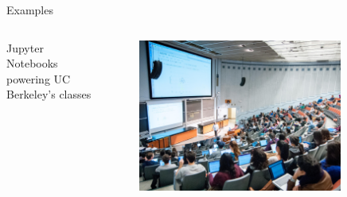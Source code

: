 \documentclass[11pt,t]{beamer}
\begin{document}
\begin{frame}[fragile]{Examples}  

	\begin{columns}[t]
		\begin{column}{.3\textwidth}
		Jupyter Notebooks powering UC Berkeley’s classes
	
 
		\end{column}
		\begin{column}{.7\textwidth}
			\vspace{-25pt}
			\begin{figure}
			\centering
			\includegraphics[width=0.85\textwidth]{jupyter_berkeley}
			
			\end{figure}
		\end{column}
	\end{columns}	
		
\end{frame}
\end{document}

